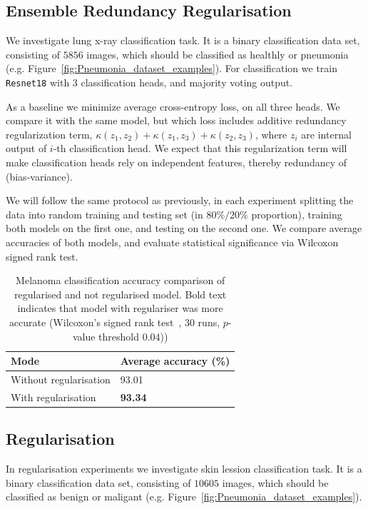 \documentclass{article}
\begin{document}
\subsection{Ensemble Redundancy Regularisation}

We investigate lung x-ray classification task. It is a binary classification data set, consisting of $5856$ images, which should be classified as healthly or pneumonia (e.g. Figure~\ref{fig:Pneumonia_dataset_examples}). For classification we train \verb|Resnet18| with 3 classification heads, and majority voting output.

As a baseline we minimize average cross-entropy loss, on all three heads. We compare it with the same model, but which loss includes additive redundancy regularization term, $\kappa(z_{1},z_{2}) + \kappa(z_{1},z_{3}) + \kappa(z_{2},z_{3})$, where $z_{i}$ are internal output of $i$-th classification head. We expect that this regularization term will make classification heads rely on independent features, thereby redundancy of (bias-variance).

We will follow the same protocol as previously, in each experiment splitting the data into random training and testing set (in $80\% / 20 \%$ proportion), training both models on the first one, and testing on the second one. We compare average accuracies of both models, and evaluate statistical significance via Wilcoxon signed rank test.


\begin{table}	
	\centering
	\begin{tabular}{ |p{4cm}|p{3cm}|}
		\hline
		Mode & Average accuracy (\%)  \\
		\hline
		Without regularisation   &   93.01 \\		
		\hline
		With regularisation  &   \textbf{93.34} \\		
		\hline
	\end{tabular}
	\caption{Melanoma classification accuracy comparison of regularised and not regularised model. Bold text indicates that model with regulariser was more accurate (Wilcoxon's signed rank test~\cite{Wilcoxon1992}, 30 runs, $p$-value threshold $0.04$))}
	\label{table:regularisation_classification_accuracies}	
\end{table}


\subsection{Regularisation}
In regularisation experiments we investigate skin lession classification task. It is a binary classification data set, consisting of $10605$ images, which should be classified as benign or maligant (e.g. Figure~\ref{fig:Pneumonia_dataset_examples}).
\end{document}
